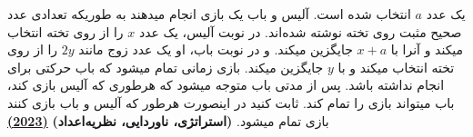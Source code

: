 یک عدد $a$ انتخاب شده است. آلیس و باب یک بازی انجام میدهند به طوریکه تعدادی عدد صحیح مثبت روی تخته نوشته شده‌اند. در نوبت آلیس، یک عدد $x$ را از روی تخته انتخاب میکند و آنرا با $x + a$ جایگزین میکند. و در نوبت باب، او یک عدد زوج مانند $2y$ را از روی تخته انتخاب میکند و با $y$ جایگزین میکند. 
بازی زمانی تمام میشود که باب حرکتی برای انجام نداشته باشد. 
پس از مدتی باب متوجه میشود که هرطوری که آلیس بازی کند، باب میتواند بازی را تمام کند. ثابت کنید در اینصورت هرطور که آلیس و باب بازی کنند بازی تمام میشود.
\textbf{(استراتژی، ناوردایی، نظریه‌اعداد)}
\href{https://artofproblemsolving.com/community/c5h3038300p27349336}{\textbf{(2023)}}